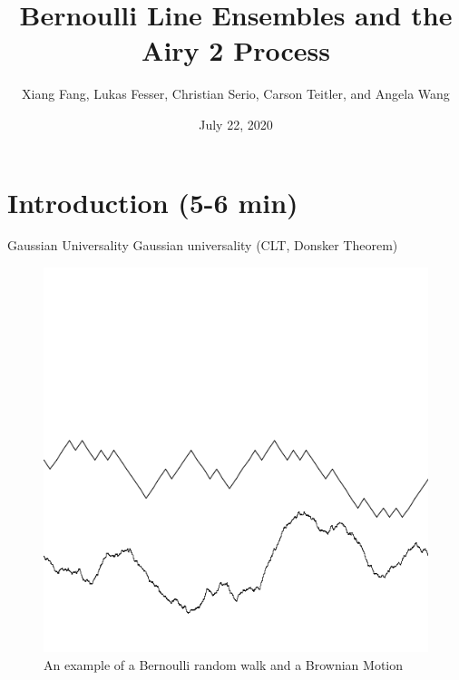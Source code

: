 \documentclass[9pt,t]{beamer}
\title{Bernoulli Line Ensembles and the Airy 2 Process}
\author{Xiang Fang, Lukas Fesser, Christian Serio, Carson Teitler, and Angela Wang}
\institute{Columbia University REU}
\date{July 22, 2020}
\begin{document}
	\begin{frame}
		\maketitle
	\end{frame}
\section{Introduction (5-6 min)}
\begin{frame}{Gaussian Universality}
Gaussian universality (CLT, Donsker Theorem)
\begin{figure}
\includegraphics[height=0.5\textheight]{graphics/Gaussian.png}
\caption{An example of a Bernoulli random walk and a Brownian Motion}
\end{figure}

\end{frame}
\end{document}
